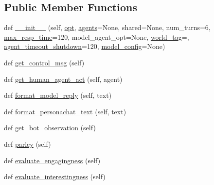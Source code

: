 \subsection*{Public Member Functions}
\begin{DoxyCompactItemize}
\item 
def \hyperlink{classmturk_1_1worlds_1_1ControllableDialogEval_a33ac04eb111e2d53b64e3126e348753e}{\+\_\+\+\_\+init\+\_\+\+\_\+} (self, \hyperlink{classmturk_1_1worlds_1_1ControllableDialogEval_acdc5ce48bdc92b72461ea2e9bfa613f8}{opt}, \hyperlink{classparlai_1_1core_1_1worlds_1_1MultiAgentDialogWorld_a05fc93525cb86edef121980fc55f9926}{agents}=None, shared=None, num\+\_\+turns=6, \hyperlink{classmturk_1_1worlds_1_1ControllableDialogEval_adcb6a5fb174ba82acc3229cc648dbfae}{max\+\_\+resp\+\_\+time}=120, model\+\_\+agent\+\_\+opt=None, \hyperlink{classmturk_1_1worlds_1_1ControllableDialogEval_a05c72f3704bab687338db610729a0611}{world\+\_\+tag}=\textquotesingle{}\textquotesingle{}, \hyperlink{classmturk_1_1worlds_1_1ControllableDialogEval_a53c001c4f6690abc729f5490d6aee0e6}{agent\+\_\+timeout\+\_\+shutdown}=120, \hyperlink{classmturk_1_1worlds_1_1ControllableDialogEval_a91067ef43ba1d7c14772db400ed7dffa}{model\+\_\+config}=None)
\item 
def \hyperlink{classmturk_1_1worlds_1_1ControllableDialogEval_ae626e15abbeee2b200a4b53dd43c961d}{get\+\_\+control\+\_\+msg} (self)
\item 
def \hyperlink{classmturk_1_1worlds_1_1ControllableDialogEval_af81be6365b8b4be98cb300aa51f1de9c}{get\+\_\+human\+\_\+agent\+\_\+act} (self, agent)
\item 
def \hyperlink{classmturk_1_1worlds_1_1ControllableDialogEval_ae1d1a4dcf645ea5776c7a7611f7ce386}{format\+\_\+model\+\_\+reply} (self, text)
\item 
def \hyperlink{classmturk_1_1worlds_1_1ControllableDialogEval_a800e08903e8ad345295c5094bdd0b13b}{format\+\_\+personachat\+\_\+text} (self, text)
\item 
def \hyperlink{classmturk_1_1worlds_1_1ControllableDialogEval_aa2b9073d3f127d25c510c8d8a362f869}{get\+\_\+bot\+\_\+observation} (self)
\item 
def \hyperlink{classmturk_1_1worlds_1_1ControllableDialogEval_aee83bc3e996406d97f7c7e1cc556e5ed}{parley} (self)
\item 
def \hyperlink{classmturk_1_1worlds_1_1ControllableDialogEval_a0cf75a08d4164e2b351a4ebf11e3bb53}{evaluate\+\_\+engagingness} (self)
\item 
def \hyperlink{classmturk_1_1worlds_1_1ControllableDialogEval_ab625c0747ada739776242995de66f5e9}{evaluate\+\_\+interestingness} (self)

\end{DoxyCompactItemize}
